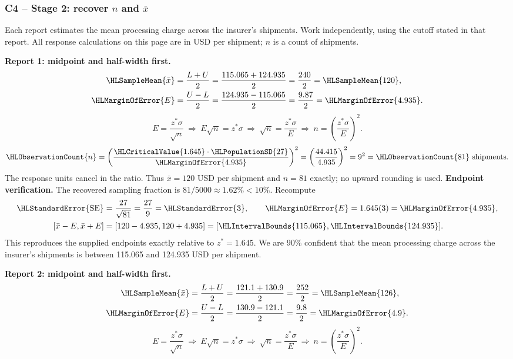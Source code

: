 \subsubsection*{C4 -- Stage 2: recover $n$ and $\bar x$}\label{sol:c4-3-b}
Each report estimates the mean processing charge across the insurer's shipments. Work independently, using the cutoff stated in that report. All response calculations on this page are in USD per shipment; $n$ is a count of shipments.
\par\noindent\textbf{Report 1: midpoint and half-width first.}
\[\begin{aligned}
\HLSampleMean{\bar x}&=\frac{L+U}{2}=\frac{115.065+124.935}{2}=\frac{240}{2}=\HLSampleMean{120},\\
\HLMarginOfError{E}&=\frac{U-L}{2}=\frac{124.935-115.065}{2}=\frac{9.87}{2}=\HLMarginOfError{4.935}.
\end{aligned}\]
\[E=\frac{z^*\sigma}{\sqrt n}\ \Longrightarrow\ E\sqrt n=z^*\sigma\ \Longrightarrow\ \sqrt n=\frac{z^*\sigma}{E}\ \Longrightarrow\ n=\left(\frac{z^*\sigma}{E}\right)^2.\]
\[\HLObservationCount{n}=\left(\frac{\HLCriticalValue{1.645}\cdot\HLPopulationSD{27}}{\HLMarginOfError{4.935}}\right)^2=\left(\frac{44.415}{4.935}\right)^2=9^2=\HLObservationCount{81}\text{ shipments}.\]
The response units cancel in the ratio. Thus $\bar x=120$ USD per shipment and $n=81$ exactly; no upward rounding is used.
\textbf{Endpoint verification.} The recovered sampling fraction is $81/5000\approx 1.62\%<10\%$. Recompute
\[\begin{aligned}
\HLStandardError{\mathrm{SE}}&=\frac{27}{\sqrt{81}}=\frac{27}{9}=\HLStandardError{3},\qquad \HLMarginOfError{E}=1.645(3)=\HLMarginOfError{4.935},\\
[\bar x-E,\bar x+E]&=[120-4.935,120+4.935]=[\HLIntervalBounds{115.065},\HLIntervalBounds{124.935}].
\end{aligned}\]
This reproduces the supplied endpoints exactly relative to $z^*=1.645$. We are 90\% confident that the mean processing charge across the insurer's shipments is between 115.065 and 124.935 USD per shipment.
\par\noindent\textbf{Report 2: midpoint and half-width first.}
\[\begin{aligned}
\HLSampleMean{\bar x}&=\frac{L+U}{2}=\frac{121.1+130.9}{2}=\frac{252}{2}=\HLSampleMean{126},\\
\HLMarginOfError{E}&=\frac{U-L}{2}=\frac{130.9-121.1}{2}=\frac{9.8}{2}=\HLMarginOfError{4.9}.
\end{aligned}\]
\[E=\frac{z^*\sigma}{\sqrt n}\ \Longrightarrow\ E\sqrt n=z^*\sigma\ \Longrightarrow\ \sqrt n=\frac{z^*\sigma}{E}\ \Longrightarrow\ n=\left(\frac{z^*\sigma}{E}\right)^2.\]
